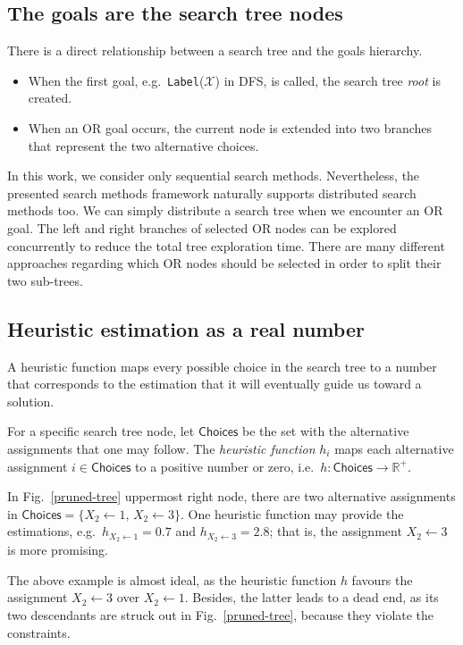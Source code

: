 \documentclass{ws-ijait}
\begin{document}
\subsection{The goals are the search tree nodes}

There is a direct relationship between a search tree and the
goals hierarchy.
\begin{itemize}
  \item When the first goal, e.g.\ 
        \texttt{Label}($\mathscr{X}$) in DFS, is called, the
        search tree \emph{root} is created.
  \item When an \textsf{OR} goal occurs, the current node is
        extended into two branches that represent the two
        alternative choices.
\end{itemize}
In this work, we consider only sequential search methods.
Nevertheless, the presented search methods framework
naturally supports distributed search methods too. We can
simply distribute a search tree when we encounter an
\textsf{OR} goal. The left and right branches of selected
\textsf{OR} nodes can be explored concurrently to reduce the
total tree exploration time. There are many different
approaches regarding which \textsf{OR} nodes should be
selected in order to split their two
sub-trees.\cite{Regin2014,Pothitos2016-CPMR}

\subsection{Heuristic estimation as a real number}

A heuristic function maps every possible choice in the
search tree to a number that corresponds to the estimation
that it will eventually guide us toward a solution.
\begin{definition}
  For a specific search tree node, let $\mathsf{Choices}$ be
  the set with the alternative assignments that one may
  follow. The \emph{heuristic function} $h_i$ maps each
  alternative assignment $i \in \mathsf{Choices}$ to a
  positive number or zero, i.e.\ $h: \mathsf{Choices} \to
  \mathbb{R}^+$.
\end{definition}
\begin{example}
  In Fig.~\ref{pruned-tree} uppermost right node, there are
  two alternative assignments in $\mathsf{Choices} = \{X_2
  \gets 1, \, X_2 \gets 3\}$. One heuristic function may
  provide the estimations, e.g.\ $h_{X_2 \gets 1} = 0.7$ and
  $h_{X_2 \gets 3} = 2.8$; that is, the assignment $X_2
  \gets 3$ is more promising.
\end{example}
The above example is almost ideal, as the heuristic function
$h$ favours the assignment $X_2 \gets 3$ over $X_2 \gets 1$.
Besides, the latter leads to a dead end, as its two
descendants are struck out in Fig.~\ref{pruned-tree},
because they violate the constraints.
\end{document}
